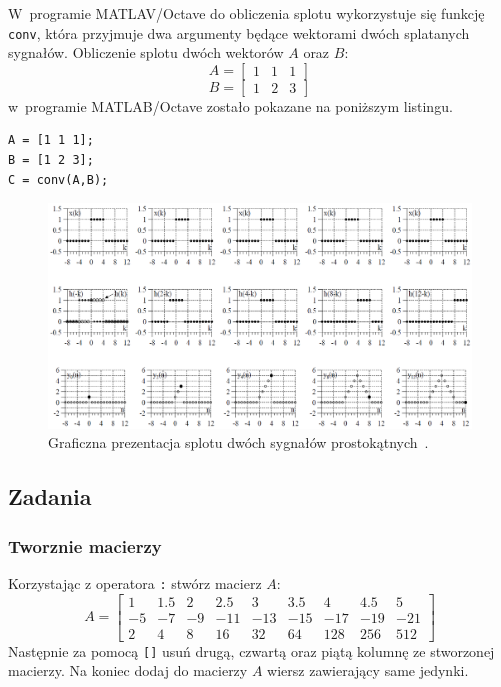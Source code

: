 W~programie MATLAV/Octave do obliczenia splotu wykorzystuje się funkcję \texttt{conv}, która przyjmuje dwa argumenty będące wektorami dwóch splatanych sygnałów. Obliczenie splotu dwóch wektorów $A$ oraz $B$:
\begin{equation*}
	A=
	\begin{bmatrix}
		1 & 1 & 1
	\end{bmatrix}
\end{equation*}
\begin{equation*}
	B=
	\begin{bmatrix}
		1 & 2 & 3
	\end{bmatrix}
\end{equation*}
w~programie MATLAB/Octave zostało pokazane na poniższym listingu.
\begin{lstlisting}[caption=Obliczanie splotu dwóch wektorów , label=lab1/lst/convolution]
A = [1 1 1];
B = [1 2 3];
C = conv(A,B);
\end{lstlisting}

\begin{figure}[hbt!]
	\centering
	\includegraphics[width=0.9\linewidth]{images/convolution}
	\caption{Graficzna prezentacja splotu dwóch sygnałów prostokątnych~\cite{zielinski_cyfrowe_przetwarzanie_sygnalow}.}
	\label{lab1/fig/convolution}
\end{figure}


\subsection{Zadania}
\subsubsection{Tworznie macierzy}
Korzystając z operatora \texttt{:} stwórz macierz $A$:
\begin{equation*}
	A=
	\begin{bmatrix}
		1 & 1.5 & 2 & 2.5 & 3 & 3.5 & 4 & 4.5 & 5 \\
		-5 & -7 & -9 & -11 & -13 & -15 & -17 & -19 & -21\\
		2 & 4 & 8 & 16 & 32 & 64 & 128 & 256 & 512
	\end{bmatrix}
\end{equation*}
Następnie za pomocą \texttt{[]} usuń drugą, czwartą oraz piątą kolumnę ze stworzonej macierzy. Na koniec dodaj do macierzy $A$ wiersz zawierający same jedynki.

